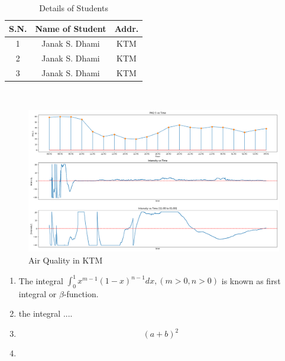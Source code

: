\lipsum[2-2]

\begin{table}[h]
    \centering
    \caption{Details of Students}
    \renewcommand{\arraystretch}{1.5}
    \begin{tabular}{|c|c|c|}
    \hline
       S.N.  & Name of Student & Addr.\\ \hline
       1  & Janak S. Dhami & KTM\\ \hline
       2  & Janak S. Dhami & KTM\\ \hline
       3  & Janak S. Dhami & KTM\\ \hline
    \end{tabular}
    \label{tab:my_label}
\end{table}

\lipsum[2-2]
\\
\begin{figure}
    \centering
    \includegraphics[width=1\linewidth]{images/aq.png}
    \caption{Air Quality in KTM}
    \label{aq}
\end{figure}

\lipsum[1-1]
\begin{enumerate}
    \item The integral $\int_0^1 x^{m-1}(1-x)^{n-1}dx, (m>0, n>0)$ is known as first integral or $\beta$-function.
    \item the integral ....
    \item \[(a+b)^2\]
    \item 
\end{enumerate}
